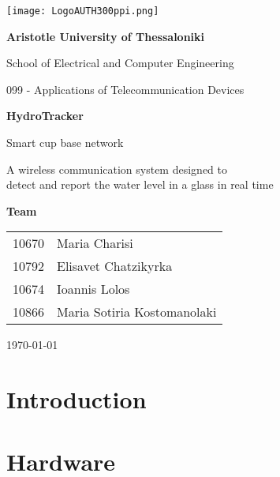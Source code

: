 \documentclass{article}
\begin{document}
\begin{titlepage}
    \centering
    \texttt{[image: LogoAUTH300ppi.png]}
    \par\vspace{2cm}

    {\Large \textbf{Aristotle University of Thessaloniki} \par}
    \vspace{0.5cm}
    {\large School of Electrical and Computer Engineering\par}
    {\large 099 - Applications of Telecommunication Devices\par}
    \vspace{3cm}

    {\Large \textbf{HydroTracker} \par}
    {\large Smart cup base network \par}
    { A wireless communication system designed to \\ detect and report the water level in a glass in real time \par}
    \vspace{3cm}

    {\large \textbf{Team} \par}
    \vspace{0.5cm}
    \begin{tabular}{ll}
    10670 & Maria Charisi \\
    10792 & Elisavet Chatzikyrka \\
    10674 & Ioannis Lolos\\
    10866 & Maria Sotiria Kostomanolaki \\
    \end{tabular}
    \par\vspace{3cm}

    {\today \par}

\end{titlepage}

\tableofcontents 

\newpage 

\section{Introduction}


\newpage
\section{Hardware}

\end{document}
